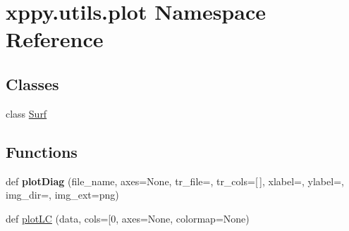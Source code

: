 \hypertarget{namespacexppy_1_1utils_1_1plot}{}\section{xppy.\+utils.\+plot Namespace Reference}
\label{namespacexppy_1_1utils_1_1plot}
\subsection*{Classes}
\begin{DoxyCompactItemize}
\item 
class \mbox{\hyperlink{classxppy_1_1utils_1_1plot_1_1_surf}{Surf}}
\end{DoxyCompactItemize}
\subsection*{Functions}
\begin{DoxyCompactItemize}
\item 
\mbox{\label{namespacexppy_1_1utils_1_1plot_adab7b96561c2487ff62dedd87e7a5659}} 
def {\bfseries plot\+Diag} (file\+\_\+name, axes=None, tr\+\_\+file=\textquotesingle{}\textquotesingle{}, tr\+\_\+cols=\mbox{[}$\,$\mbox{]}, xlabel=\textquotesingle{}\textquotesingle{}, ylabel=\textquotesingle{}\textquotesingle{}, img\+\_\+dir=\textquotesingle{}\textquotesingle{}, img\+\_\+ext=\textquotesingle{}png\textquotesingle{})
\item 
def \mbox{\hyperlink{namespacexppy_1_1utils_1_1plot_a76a5b63c867b8095130516cdba1c7533}{plot\+LC}} (data, cols=\mbox{[}0, axes=None, colormap=None)
\end{DoxyCompactItemize}


